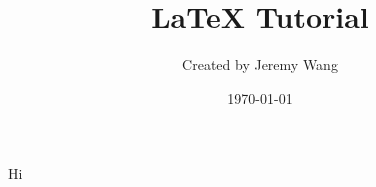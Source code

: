 \documentclass[12pt]{article}
\title{\LaTeX{} Tutorial}
\author{Created by Jeremy Wang}
\date{\today}
\begin{document}
  \maketitle

  Hi
\end{document}
